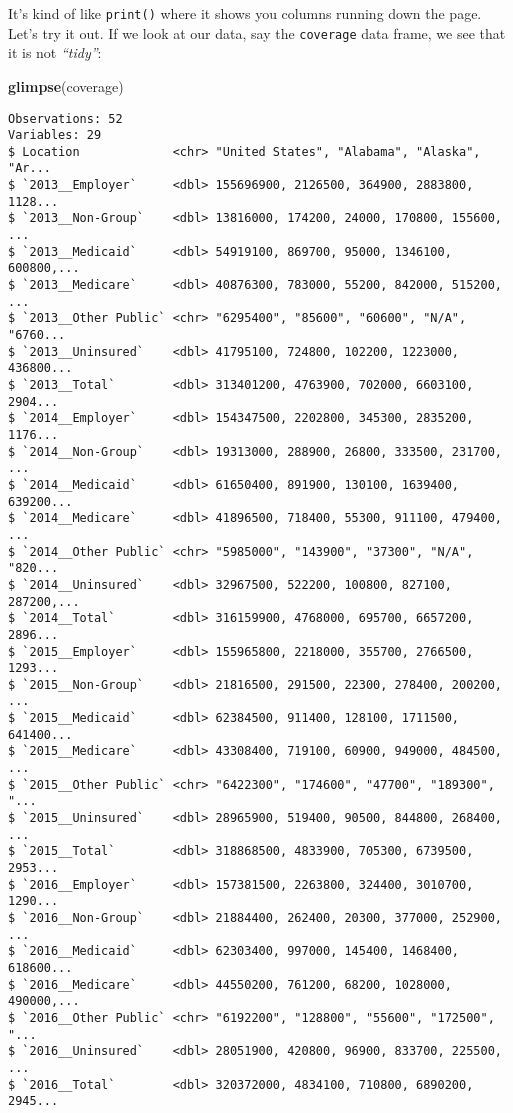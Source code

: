 \documentclass[]{article}
\newenvironment{Shaded}{\begin{snugshade}}{\end{snugshade}}
\newcommand{\KeywordTok}[1]{\textcolor[rgb]{0.13,0.29,0.53}{\textbf{#1}}}
\newcommand{\NormalTok}[1]{#1}
\begin{document}
It's kind of like \texttt{print()} where it shows you columns running
down the page. Let's try it out. If we look at our data, say the
\texttt{coverage} data frame, we see that it is not \emph{``tidy''}:

\begin{Shaded}
\begin{Highlighting}[]
\KeywordTok{glimpse}\NormalTok{(coverage)}
\end{Highlighting}
\end{Shaded}

\begin{verbatim}
Observations: 52
Variables: 29
$ Location             <chr> "United States", "Alabama", "Alaska", "Ar...
$ `2013__Employer`     <dbl> 155696900, 2126500, 364900, 2883800, 1128...
$ `2013__Non-Group`    <dbl> 13816000, 174200, 24000, 170800, 155600, ...
$ `2013__Medicaid`     <dbl> 54919100, 869700, 95000, 1346100, 600800,...
$ `2013__Medicare`     <dbl> 40876300, 783000, 55200, 842000, 515200, ...
$ `2013__Other Public` <chr> "6295400", "85600", "60600", "N/A", "6760...
$ `2013__Uninsured`    <dbl> 41795100, 724800, 102200, 1223000, 436800...
$ `2013__Total`        <dbl> 313401200, 4763900, 702000, 6603100, 2904...
$ `2014__Employer`     <dbl> 154347500, 2202800, 345300, 2835200, 1176...
$ `2014__Non-Group`    <dbl> 19313000, 288900, 26800, 333500, 231700, ...
$ `2014__Medicaid`     <dbl> 61650400, 891900, 130100, 1639400, 639200...
$ `2014__Medicare`     <dbl> 41896500, 718400, 55300, 911100, 479400, ...
$ `2014__Other Public` <chr> "5985000", "143900", "37300", "N/A", "820...
$ `2014__Uninsured`    <dbl> 32967500, 522200, 100800, 827100, 287200,...
$ `2014__Total`        <dbl> 316159900, 4768000, 695700, 6657200, 2896...
$ `2015__Employer`     <dbl> 155965800, 2218000, 355700, 2766500, 1293...
$ `2015__Non-Group`    <dbl> 21816500, 291500, 22300, 278400, 200200, ...
$ `2015__Medicaid`     <dbl> 62384500, 911400, 128100, 1711500, 641400...
$ `2015__Medicare`     <dbl> 43308400, 719100, 60900, 949000, 484500, ...
$ `2015__Other Public` <chr> "6422300", "174600", "47700", "189300", "...
$ `2015__Uninsured`    <dbl> 28965900, 519400, 90500, 844800, 268400, ...
$ `2015__Total`        <dbl> 318868500, 4833900, 705300, 6739500, 2953...
$ `2016__Employer`     <dbl> 157381500, 2263800, 324400, 3010700, 1290...
$ `2016__Non-Group`    <dbl> 21884400, 262400, 20300, 377000, 252900, ...
$ `2016__Medicaid`     <dbl> 62303400, 997000, 145400, 1468400, 618600...
$ `2016__Medicare`     <dbl> 44550200, 761200, 68200, 1028000, 490000,...
$ `2016__Other Public` <chr> "6192200", "128800", "55600", "172500", "...
$ `2016__Uninsured`    <dbl> 28051900, 420800, 96900, 833700, 225500, ...
$ `2016__Total`        <dbl> 320372000, 4834100, 710800, 6890200, 2945...
\end{verbatim}
\end{document}
